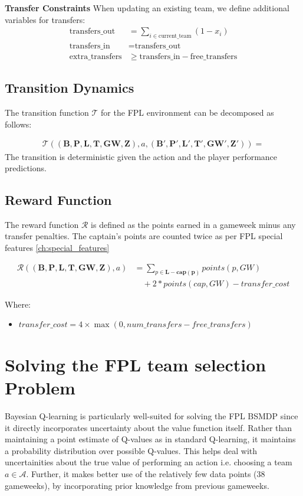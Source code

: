 \textbf{Transfer Constraints}
When updating an existing team, we define additional variables for transfers:
\begin{align}
    \text{transfers\_out} &= \sum_{i \in \text{current\_team}} (1 - x_i) \\
    \text{transfers\_in} &= \text{transfers\_out} \\
    \text{extra\_transfers} &\geq \text{transfers\_in} - \text{free\_transfers}
\end{align}

\subsection{Transition Dynamics}

The transition function $\mathcal{T}$ for the FPL environment can be decomposed as follows:

\begin{align}
    \mathcal{T}((\mathbf{B}, \mathbf{P}, \mathbf{L}, \mathbf{T}, \mathbf{GW}, \mathbf{Z}), a, (\mathbf{B}', \mathbf{P}', \mathbf{L}', \mathbf{T}', \mathbf{GW}', \mathbf{Z}')) = 
\end{align}
The transition is deterministic given the action and the player performance predictions.

\subsection{Reward Function}

The reward function $\mathcal{R}$ is defined as the points earned in a gameweek minus any transfer penalties. The captain's points are counted twice as per FPL special features \ref{ch:special_features}

\begin{align}
\mathcal{R}((\mathbf{B}, \mathbf{P}, \mathbf{L}, \mathbf{T}, \mathbf{GW}, \mathbf{Z}), a) &= \sum_{p \in \mathbf{L - cap(p)}} points(p, GW) \nonumber \\
&\quad + 2*points(cap, GW) - transfer\_cost
\end{align}

Where:
\begin{itemize}
    \item $transfer\_cost = 4 \times \max(0, num\_transfers - free\_transfers)$
\end{itemize}


\section{Solving the FPL team selection Problem}
Bayesian Q-learning is particularly well-suited for solving the FPL BSMDP since it directly incorporates uncertainty about the value function itself. Rather than maintaining a point estimate of Q-values as in standard Q-learning, it maintains a probability distribution over possible Q-values. This helps deal with uncertainities about the true value of performing an action i.e. choosing a team $a \in \mathcal{A}$. Further, it makes better use of the relatively few data points (38 gameweeks), by incorporating prior knowledge from previous gameweeks.

